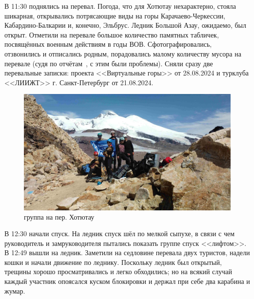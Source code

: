 В 11:30 поднялись на перевал. Погода, что для Хотютау нехарактерно, стояла шикарная, открывались потрясающие виды на горы Карачаево-Черкессии, Кабардино-Балкарии и, конечно, Эльбрус. Ледник Большой Азау, ожидаемо, был открыт. Отметили на перевале большое количество памятных табличек, посвящённых военным действиям в годы ВОВ. Сфотографировались, отзвонились и отписались родным, порадовались малому количеству мусора на перевале (судя по отчётам~\cite{Korolyov2018}, с этим были проблемы). Сняли сразу две перевальные записки: проекта <<Виртуальные горы>> от 28.08.2024 и турклуба <<ЛИИЖТ>> г. Санкт-Петербург от 21.08.2024.

\begin{figure}[h!]
	\centering
	\includegraphics[width=0.7\linewidth]{../pics/DJI_0899}
	\caption{группа на пер. Хотютау}
	\label{fig:hotyutau_1}
\end{figure}

В 12:30 начали спуск. На ледник спуск шёл по мелкой сыпухе, в связи с чем руководитель и замруководителя пытались показать группе спуск <<лифтом>>. В 12:49 вышли на ледник. Заметили на седловине перевала двух туристов, надели кошки и начали движение по леднику. Поскольку ледник был открытый, трещины хорошо просматривались и легко обходились; но на всякий случай каждый участник опоясался куском блокировки и держал при себе два карабина и жумар.

